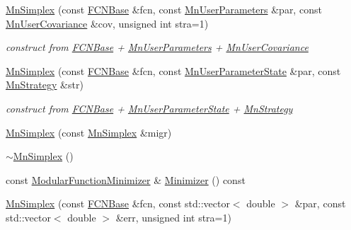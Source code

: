 \begin{DoxyCompactItemize}
\mbox{\hyperlink{classROOT_1_1Minuit2_1_1MnSimplex_a6583a53c38490030a1ff7fe80bdc69bc}{Mn\+Simplex}} (const \mbox{\hyperlink{classROOT_1_1Minuit2_1_1FCNBase}{F\+C\+N\+Base}} \&fcn, const \mbox{\hyperlink{classROOT_1_1Minuit2_1_1MnUserParameters}{Mn\+User\+Parameters}} \&par, const \mbox{\hyperlink{classROOT_1_1Minuit2_1_1MnUserCovariance}{Mn\+User\+Covariance}} \&cov, unsigned int stra=1)
\begin{DoxyCompactList}\small\item\em construct from \mbox{\hyperlink{classROOT_1_1Minuit2_1_1FCNBase}{F\+C\+N\+Base}} + \mbox{\hyperlink{classROOT_1_1Minuit2_1_1MnUserParameters}{Mn\+User\+Parameters}} + \mbox{\hyperlink{classROOT_1_1Minuit2_1_1MnUserCovariance}{Mn\+User\+Covariance}} \end{DoxyCompactList}\item 
\mbox{\hyperlink{classROOT_1_1Minuit2_1_1MnSimplex_a3dc51e6d9719501f7fce44a66444c6d2}{Mn\+Simplex}} (const \mbox{\hyperlink{classROOT_1_1Minuit2_1_1FCNBase}{F\+C\+N\+Base}} \&fcn, const \mbox{\hyperlink{classROOT_1_1Minuit2_1_1MnUserParameterState}{Mn\+User\+Parameter\+State}} \&par, const \mbox{\hyperlink{classROOT_1_1Minuit2_1_1MnStrategy}{Mn\+Strategy}} \&str)
\begin{DoxyCompactList}\small\item\em construct from \mbox{\hyperlink{classROOT_1_1Minuit2_1_1FCNBase}{F\+C\+N\+Base}} + \mbox{\hyperlink{classROOT_1_1Minuit2_1_1MnUserParameterState}{Mn\+User\+Parameter\+State}} + \mbox{\hyperlink{classROOT_1_1Minuit2_1_1MnStrategy}{Mn\+Strategy}} \end{DoxyCompactList}\item 
\mbox{\hyperlink{classROOT_1_1Minuit2_1_1MnSimplex_a47aec4c766dc559a1a1e1fe7809d0a88}{Mn\+Simplex}} (const \mbox{\hyperlink{classROOT_1_1Minuit2_1_1MnSimplex}{Mn\+Simplex}} \&migr)
\item 
\mbox{\hyperlink{classROOT_1_1Minuit2_1_1MnSimplex_a0cab2c1cf29e82fdd340eb78e0cd7ff2}{$\sim$\+Mn\+Simplex}} ()
\item 
const \mbox{\hyperlink{classROOT_1_1Minuit2_1_1ModularFunctionMinimizer}{Modular\+Function\+Minimizer}} \& \mbox{\hyperlink{classROOT_1_1Minuit2_1_1MnSimplex_a8fa3495353e667d85e7dbeaffa94b94c}{Minimizer}} () const
\item 
\mbox{\hyperlink{classROOT_1_1Minuit2_1_1MnSimplex_abc4ddf29140ab0ada1e90afbc33359cf}{Mn\+Simplex}} (const \mbox{\hyperlink{classROOT_1_1Minuit2_1_1FCNBase}{F\+C\+N\+Base}} \&fcn, const std\+::vector$<$ double $>$ \&par, const std\+::vector$<$ double $>$ \&err, unsigned int stra=1)

\end{DoxyCompactItemize}
